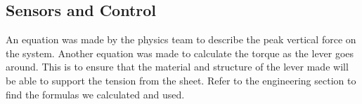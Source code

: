 \begin{figure}[htp]
\begin{minipage}{.32\textwidth}
\end{minipage}
\end{figure}

\subsection*{Sensors and Control}
An equation was made by the physics team to describe the peak vertical force on the system. Another equation was made to calculate the torque as the lever goes around. This is to ensure that the material and structure of the lever made will be able to support the tension from the sheet. Refer to the engineering section to find the formulas we calculated and used. 